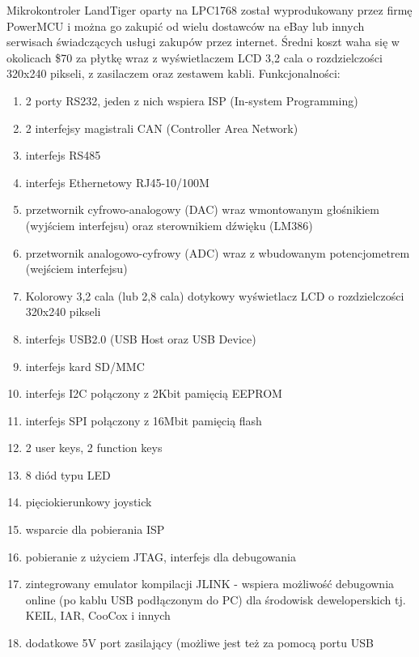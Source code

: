 \documentclass{BscUS}
\begin{document}
Mikrokontroler LandTiger oparty na LPC1768 został wyprodukowany przez firmę PowerMCU i można go zakupić od wielu dostawców na eBay lub innych serwisach świadczących usługi zakupów przez internet. Średni koszt waha się w okolicach \$70 za płytkę wraz z wyświetlaczem LCD 3,2 cala o rozdzielczości 320x240 pikseli, z zasilaczem oraz zestawem kabli. \cite{landtigerDesc}
\newline
Funkcjonalności:
\begin{enumerate} [label=(\alph*)]
\item 2 porty RS232, jeden z nich wspiera ISP (In-system Programming)
\item 2 interfejsy magistrali CAN (Controller Area Network)
\item interfejs RS485
\item interfejs Ethernetowy RJ45-10/100M 
\item przetwornik cyfrowo-analogowy (DAC) wraz wmontowanym głośnikiem (wyjściem interfejsu) oraz sterownikiem dźwięku (LM386)
\item przetwornik analogowo-cyfrowy (ADC) wraz z wbudowanym potencjometrem (wejściem interfejsu)
\item Kolorowy 3,2 cala (lub 2,8 cala) dotykowy wyświetlacz LCD o rozdzielczości 320x240 pikseli
\item interfejs USB2.0 (USB Host oraz USB Device)
\item interfejs kard SD/MMC
\item interfejs I2C połączony z 2Kbit pamięcią EEPROM
\item interfejs SPI połączony z 16Mbit pamięcią flash
\item 2 user keys, 2 function keys
\item 8 diód typu LED
\item pięciokierunkowy joystick
\item wsparcie dla pobierania ISP
\item pobieranie z użyciem JTAG, interfejs dla debugowania
\item zintegrowany emulator kompilacji JLINK - wspiera możliwość debugownia online (po kablu USB podłączonym do PC) dla środowisk deweloperskich tj. KEIL, IAR, CooCox i innych
\item dodatkowe 5V port zasilający (możliwe jest też za pomocą portu USB 
\end{enumerate}
\end{document}
